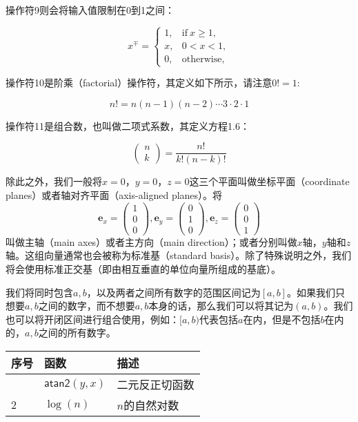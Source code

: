 \documentclass[
  paper=a4,
  ,captions=tableheading
]{scrartcl}
\begin{document}
操作符9则会将输入值限制在0到1之间：

\[
x^\mp = \left \{ 
\begin{array}{}
1, & \text{if} \ x \ge 1, \\
x, & 0 < x < 1, \\
0, & \text{otherwise},
\end{array} 
\right.
\tag{1.4} 
\]

操作符10是阶乘（factorial）操作符，其定义如下所示，请注意\(0! = 1:\)

\[
n! = n(n-1)(n-2) \cdots 3 \cdot 2 \cdot 1 \tag{1.5}
\]

操作符11是组合数，也叫做二项式系数，其定义方程1.6：

\[
\left( \begin{array}{} n \\ k  \end{array}\right) = 
\frac{n!}{k! (n-k)!} \tag{1.6}
\]

除此之外，我们一般将\(x = 0\)，\(y = 0\)，\(z = 0\)这三个平面叫做坐标平面（coordinate
planes）或者轴对齐平面（axis-aligned planes）。将 \[
\mathbf{e}_x = \left( \begin{array}{c} 1 \\ 0 \\ 0  \end{array} \right),
\mathbf{e}_y = \left( \begin{array}{c} 0 \\ 1 \\ 0  \end{array} \right),
\mathbf{e}_z = \left( \begin{array}{c} 0 \\ 0 \\ 1  \end{array} \right)
\] 叫做主轴（main axes）或者主方向（main
direction）；或者分别叫做\(x\)轴，\(y\)轴和\(z\)轴。这组向量通常也会被称为标准基（standard
basis）。除了特殊说明之外，我们将会使用标准正交基（即由相互垂直的单位向量所组成的基底）。

我们将同时包含\(a,b\)，以及两者之间所有数字的范围区间记为\([a,b]\)。如果我们只想要\(a,b\)之间的数字，而不想要\(a,b\)本身的话，那么我们可以将其记为\((a, b)\)。我们也可以将开闭区间进行组合使用，例如：\([a,b)\)代表包括\(a\)在内，但是不包括\(b\)在内的，\(a,b\)之间的所有数字。

\begin{longtable}[]{@{}lll@{}}
\toprule\noalign{}
序号 & 函数 & 描述 \\
\midrule\noalign{}
\endhead
\bottomrule\noalign{}
\endlastfoot
1 & \(\mathsf{atan2}(y, x)\) & 二元反正切函数 \\
2 & \(\log(n)\) & \(n\)的自然对数 \\
\end{longtable}
\end{document}
